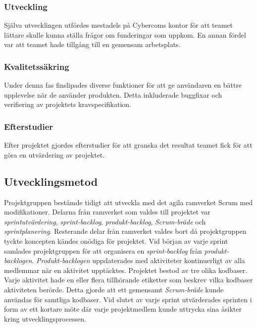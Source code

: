 \subsubsection*{Utveckling}
Själva utvecklingen utfördes mestadels på Cybercoms kontor för att teamet lättare skulle kunna ställa frågor om funderingar som uppkom. En annan fördel var att teamet hade tillgång till en gemensam arbetsplats.

\subsubsection*{Kvalitetssäkring}
Under denna fas finslipades diverse funktioner för att ge användaren en bättre upplevelse när de använder produkten. Detta inkluderade buggfixar och verifiering av projektets kravspecifikation.

\subsubsection*{Efterstudier}
Efter projektet gjordes efterstudier för att granska det resultat teamet fick för att göra en utvärdering av projektet.

\subsection{Utvecklingsmetod} \label{main:Scrum}
Projektgruppen bestämde tidigt att utveckla med det agila ramverket Scrum med modifikationer. Delarna från ramverket som valdes till projektet var \textit{sprintutvärdering}, \textit{sprint-backlog}, \textit{produkt-backlog}, \textit{Scrum-bräde} och \textit{sprintplanering}. Resterande delar från ramverket valdes bort då projektgruppen tyckte koncepten kändes onödiga för projektet. Vid början av varje sprint samlades projektgruppen för att organisera en \textit{sprint-backlog} från \textit{produkt-backlogen}. \textit{Produkt-backlogen} uppdaterades med aktiviteter kontinuerligt av alla medlemmar när en aktivitet upptäcktes. Projektet bestod av tre olika kodbaser. Varje aktivitet hade en eller flera tillhörande etiketter som beskrev vilka kodbaser aktiviteten berörde. Detta gjorde att ett gemensamt \textit{Scrum-bräde} kunde användas för samtliga kodbaser. Vid slutet av varje sprint utvärderades sprinten i form av ett kortare möte där varje projektmedlem kunde uttrycka sina åsikter kring utvecklingsprocessen. 

